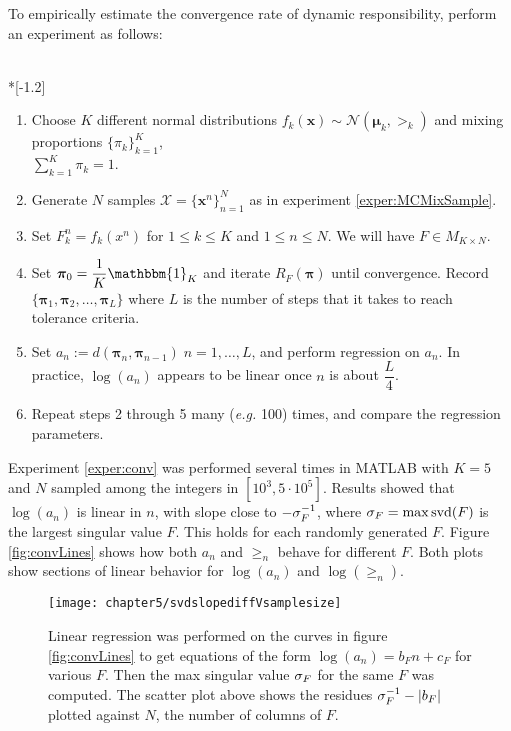 To empirically estimate the convergence rate of dynamic responsibility, perform an experiment as follows:
\begin{experiment}\label{exper:conv}
	\ \\*[-1.2\baselineskip]
	\begin{enumerate}
		\item Choose \( K \) different normal distributions \( f_k(\bm x) \sim \mathcal{N}(\bm\mu_k,\bm\gt_k) \)
		and mixing proportions \( \{\pi_k\}_{k=1}^{K}\), \\\( \sum_{k=1}^{K}\pi_k =1 \).
		\item Generate \( N \) samples $\mathcal{X}=\{\bm x^n\}_{n=1}^{N}$ as in experiment \ref{exper:MCMixSample}.
		\item Set \( F_{k}^{n} = f_k(x^n) \) for \( 1\leq k\leq K \) and \( 1\leq n\leq N \). We will have \( F\in M_{K\times N} \).
		\item Set \( \bm\pi_0 = \dfrac{1}{K}\mathbbm{1}_K \) and iterate \( R_F(\bm\pi) \) until convergence.  Record \( \{\bm\pi_1,\bm\pi_2,\ldots, \bm\pi_L\} \) where \( L \) is the number of steps that it takes to reach tolerance criteria.
		\item Set \( a_{n} := d(\bm\pi_n, \bm\pi_{n-1})\; n=1,\ldots,L \), and perform regression on \( a_n \).  In practice, \( \log(a_n) \) appears to be linear once \( n \) is about \( \dfrac{L}{4} \).
		\item Repeat steps 2 through 5 many (\textit{e.g.} 100) times, and compare the regression parameters.
		
	\end{enumerate}
\end{experiment}

Experiment \ref{exper:conv} was performed several times in MATLAB with \( K=5 \) and \( N \) sampled among the integers in \( [10^3,5\cdot10^5] \).  Results showed that \( \log(a_n) \) is linear in \( n \), with slope close to \( -\sigma_F^{-1} \), where \( \sigma_F = \max \operatorname{svd}(F) \) is the largest singular value \( F \). This holds for each randomly generated \( F \).  Figure \ref{fig:convLines} shows how both \( a_n \) and \( \ge_n \) behave for different \( F. \)  Both plots show sections of linear behavior for \( \log(a_n) \) and \( \log(\ge_n) \).
\begin{figure}[h]
	\centering
	\texttt{[image: chapter5/svdslopediffVsamplesize]}
	
	\caption[Plot of differences \( \gs_F^{-1}-|b_F| \) for various \( F \) ]{Linear regression was performed on the curves in figure \ref{fig:convLines} to get equations of the form \( \log(a_n) = b_{F}n +c_{F} \) for various \( F \).  Then the max singular value \( \sigma_F \) for the same \( F \) was computed.  The scatter plot above shows the residues \( \gs_F^{-1}-|b_F| \) plotted against \( N \), the number of columns of \( F \). }\label{fig:residuesVsamplesize}
\end{figure}

